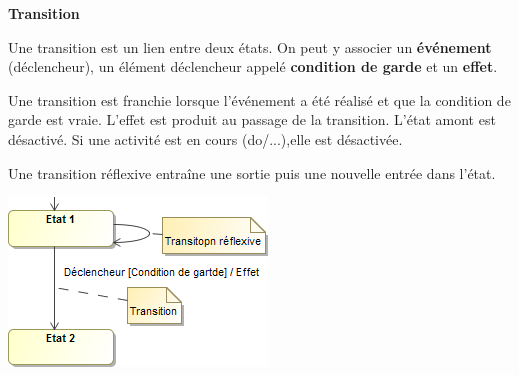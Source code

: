 \documentclass[10pt]{article}
\begin{document}
\begin{defi}
\begin{minipage}[c]{.55\linewidth}
\textbf{Transition}

Une transition est un lien entre deux états. On peut y associer un \textbf{événement} (déclencheur), un élément déclencheur appelé \textbf{condition de garde} et un \textbf{effet}. 

Une transition est franchie lorsque l'événement a été réalisé et que la condition de garde est vraie. 
L'effet est produit au passage de la transition. L'état amont est désactivé. Si une activité est en cours (do/...),elle est désactivée. 



Une transition réflexive entraîne une sortie puis une nouvelle entrée dans l'état. 
\end{minipage} \hfill
\begin{minipage}[c]{.4 \linewidth}
\begin{center}
\includegraphics[width=.95\textwidth]{images/Transition}
\end{center}
\end{minipage}
\end{defi}
\end{document}
